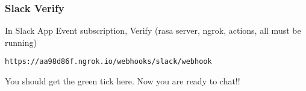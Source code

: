 \begin{frame}[fragile]\frametitle{Slack Verify}
In Slack App Event subscription, Verify (rasa server, ngrok, actions, all must be running)
\begin{lstlisting}
https://aa98d86f.ngrok.io/webhooks/slack/webhook
\end{lstlisting}
You should get the green tick here. Now you are ready to chat!!
\end{frame}








